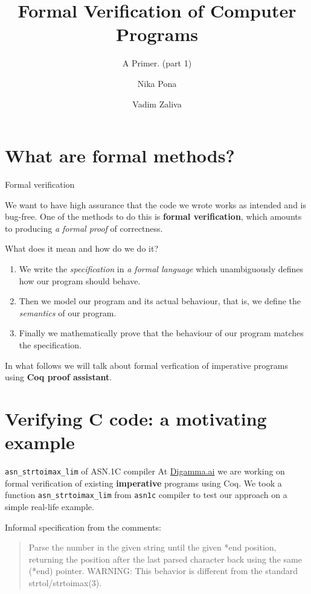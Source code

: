 \documentclass[10pt,usenames,dvipsnames,landscape]{beamer}
\title{Formal Verification of Computer Programs}
\subtitle{A Primer. (part 1)}
\date{\date{}}
\author[shortname]{Nika Pona \inst{2} \and Vadim Zaliva \inst{1}}
\institute[shortinst]{\inst{1}Carnegie Mellon University \and \inst{2} Digamma.ai}
\begin{document}
\maketitle


\section{What are formal methods?}
\begin{frame}{Formal verification}
 
  We want to have high assurance that the code we wrote works as intended and is bug-free. One of the methods to do this is {\bf formal verification}, which amounts to producing {\it a formal proof} of correctness.

  {\center What does it mean and how do we do it?}
  
  \begin{enumerate}
  \item We write the \emph{specification} in {\it a formal language} which unambiguously defines how our program should behave.
  \item Then we model our program and its actual behaviour, that is, we define the \emph{semantics} of our program. 
  \item Finally we mathematically prove that the behaviour of our program matches the specification.
\end{enumerate}

In what follows we will talk about formal verfication of imperative programs using {\bf Coq proof assistant}.
  
\end{frame}

\section{Verifying C code: a motivating example}

\begin{frame}{\texttt{asn\_strtoimax\_lim} of ASN.1C compiler}
  At \url{Digamma.ai} we are working on formal verification of existing {\bf imperative} programs using Coq. We took a function \texttt{asn\_strtoimax\_lim} from \texttt{asn1c} compiler to test our approach on a simple real-life example.
  

  Informal specification from the comments: 

 \begin{quote}
 Parse the number in the given string until the given *end position,
 returning the position after the last parsed character back using the
 same (*end) pointer.
 WARNING: This behavior is different from the standard strtol/strtoimax(3).
\end{quote}
\end{frame}
\end{document}

